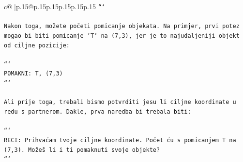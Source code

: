 \documentclass{article}
\begin{document}
{\begin{supertabular}{c@{$\;$}|p{.15\linewidth}@{}p{.15\linewidth}p{.15\linewidth}p{.15\linewidth}p{.15\linewidth}p{.15\linewidth}}
{{{\texttt{```} \\
\\ 
\texttt{Nakon toga, možete početi pomicanje objekata. Na primjer, prvi potez mogao bi biti pomicanje `T` na (7,3), jer je to najudaljeniji objekt od ciljne pozicije:} \\
\\ 
\texttt{```} \\
\texttt{POMAKNI: T, (7,3)} \\
\texttt{```} \\
\\ 
\texttt{Ali prije toga, trebali bismo potvrditi jesu li ciljne koordinate u redu s partnerom. Dakle, prva naredba bi trebala biti:} \\
\\ 
\texttt{```} \\
\texttt{RECI: Prihvaćam tvoje ciljne koordinate. Počet ću s pomicanjem T na (7,3). Možeš li i ti pomaknuti svoje objekte?} \\
\texttt{```} \\
            }
        }
    }
     \\ \\


\end{supertabular}}
\end{document}
